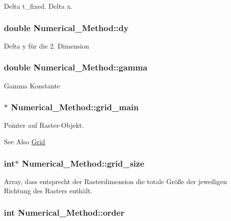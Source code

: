 Delta t\-\_\-fixed. Delta x. \hypertarget{classNumerical__Method_a531122199f55330a4fff143fdae3198d}{
\subsubsection[{dy}]{\setlength{\rightskip}{0pt plus 5cm}double Numerical\-\_\-\-Method\-::dy}}\label{classNumerical__Method_a531122199f55330a4fff143fdae3198d}
Delta y für die 2. Dimension \hypertarget{classNumerical__Method_a03221980e39158a3116b00d777a86606}{
\subsubsection[{gamma}]{\setlength{\rightskip}{0pt plus 5cm}double Numerical\-\_\-\-Method\-::gamma}}\label{classNumerical__Method_a03221980e39158a3116b00d777a86606}
Gamma Konstante \hypertarget{classNumerical__Method_a78f90e67fce4934dfd2b7473d3f4c896}{
\subsubsection[{grid\-\_\-main}]{$\ast$ Numerical\-\_\-\-Method\-::grid\-\_\-main}}\label{classNumerical__Method_a78f90e67fce4934dfd2b7473d3f4c896}
Pointer auf Raster-\/\-Objekt. \begin{DoxySeeAlso}{See Also}
\hyperlink{classGrid}{Grid} 
\end{DoxySeeAlso}
\hypertarget{classNumerical__Method_a916bdb33da9738c2d387b46a37b89ddc}{
\subsubsection[{grid\-\_\-size}]{\setlength{\rightskip}{0pt plus 5cm}int$\ast$ Numerical\-\_\-\-Method\-::grid\-\_\-size}}\label{classNumerical__Method_a916bdb33da9738c2d387b46a37b89ddc}
Array, dass entsprecht der Rasterdimension die totale Größe der jeweiligen Richtung des Rasters enthält. \hypertarget{classNumerical__Method_a711b3c69b3bd338fd8c2ee5c4396ba7b}{
\subsubsection[{order}]{\setlength{\rightskip}{0pt plus 5cm}int Numerical\-\_\-\-Method\-::order}}\label{classNumerical__Method_a711b3c69b3bd338fd8c2ee5c4396ba7b}
